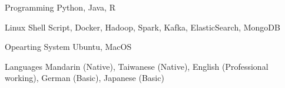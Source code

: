 


\begin{cvskills}


\cvskill
{Programming} %
{Python, Java, R} %


\cvskill
{Linux} %
{Shell Script, Docker, Hadoop, Spark, Kafka, ElasticSearch, MongoDB} %



\cvskill
{Opearting System} %
{Ubuntu, MacOS} %


\cvskill
{Languages} %
{Mandarin (Native), Taiwanese (Native), English (Professional working), German (Basic), Japanese (Basic)} %


\end{cvskills}